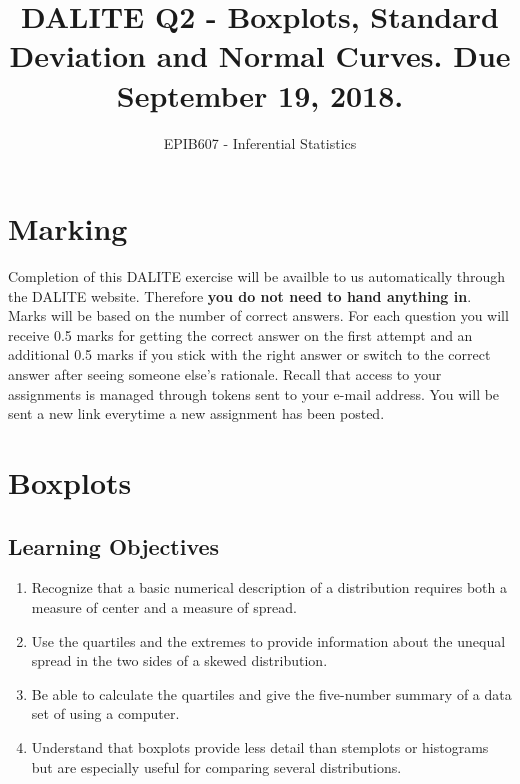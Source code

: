 \documentclass[letterpaper,9pt,twocolumn,twoside,printwatermark=false]{pinp}
\title{DALITE Q2 - Boxplots, Standard Deviation and Normal Curves. Due
September 19, 2018.}
\author[a]{EPIB607 - Inferential Statistics}
\affil[a]{Fall 2018, McGill University}
\providecommand{\tightlist}{%
  \setlength{\itemsep}{0pt}\setlength{\parskip}{0pt}}
\begin{document}
\verticaladjustment{-2pt}

\maketitle
\thispagestyle{firststyle}



\section*{Marking}\label{marking}

Completion of this DALITE exercise will be availble to us automatically
through the DALITE website. Therefore \textbf{you do not need to hand
anything in}. Marks will be based on the number of correct answers. For
each question you will receive 0.5 marks for getting the correct answer
on the first attempt and an additional 0.5 marks if you stick with the
right answer or switch to the correct answer after seeing someone else's
rationale. Recall that access to your assignments is managed through
tokens sent to your e-mail address. You will be sent a new link
everytime a new assignment has been posted.

\section{Boxplots}\label{boxplots}

\subsection{Learning Objectives}\label{learning-objectives}

\begin{enumerate}
\def\labelenumi{\arabic{enumi}.}
\tightlist
\item
  Recognize that a basic numerical description of a distribution
  requires both a measure of center and a measure of spread.
\item
  Use the quartiles and the extremes to provide information about the
  unequal spread in the two sides of a skewed distribution.
\item
  Be able to calculate the quartiles and give the five-number summary of
  a data set of using a computer.
\item
  Understand that boxplots provide less detail than stemplots or
  histograms but are especially useful for comparing several
  distributions.
\end{enumerate}
\end{document}
